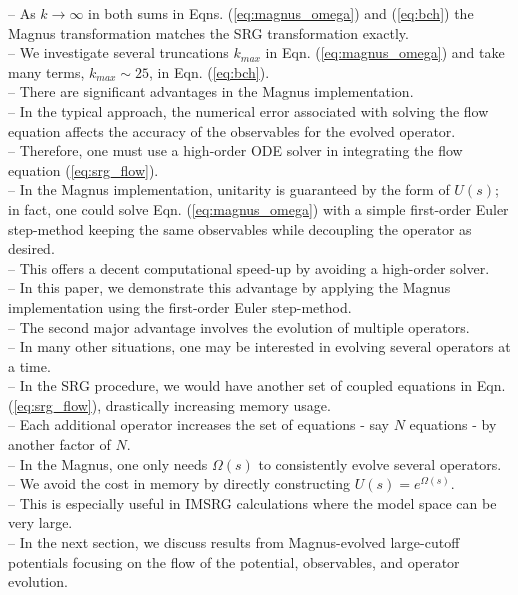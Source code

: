 \documentclass[preprintnumbers,floatfix,aps,prc,preprint,nofootinbib]{revtex4-1}
\begin{document}
%
-- As $k \rightarrow \infty$ in both sums in Eqns. (\ref{eq:magnus_omega}) and (\ref{eq:bch}) the Magnus transformation matches the SRG transformation exactly.
\\
-- We investigate several truncations $k_{max}$ in Eqn. (\ref{eq:magnus_omega}) and take many terms, $k_{max} \sim 25$, in Eqn. (\ref{eq:bch}).
\\
-- There are significant advantages in the Magnus implementation.
\\
-- In the typical approach, the numerical error associated with solving the flow equation affects the accuracy of the observables for the evolved operator.
\\
-- Therefore, one must use a high-order ODE solver in integrating the flow equation (\ref{eq:srg_flow}).
\\
-- In the Magnus implementation, unitarity is guaranteed by the form of $U(s)$; in fact, one could solve Eqn. (\ref{eq:magnus_omega}) with a simple first-order Euler step-method keeping the same observables while decoupling the operator as desired.
\\
-- This offers a decent computational speed-up by avoiding a high-order solver.
\\
-- In this paper, we demonstrate this advantage by applying the Magnus implementation using the first-order Euler step-method.
\\
-- The second major advantage involves the evolution of multiple operators.
\\
-- In many other situations, one may be interested in evolving several operators at a time.
\\
-- In the SRG procedure, we would have another set of coupled equations in Eqn. (\ref{eq:srg_flow}), drastically increasing memory usage.
\\
-- Each additional operator increases the set of equations - say $N$ equations - by another factor of $N$.
\\
-- In the Magnus, one only needs $\Omega(s)$ to consistently evolve several operators.
\\
-- We avoid the cost in memory by directly constructing $U(s)=e^{\Omega(s)}$.
\\
-- This is especially useful in IMSRG calculations where the model space can be very large.
\\
-- In the next section, we discuss results from Magnus-evolved large-cutoff potentials focusing on the flow of the potential, observables, and operator evolution.
\end{document}
